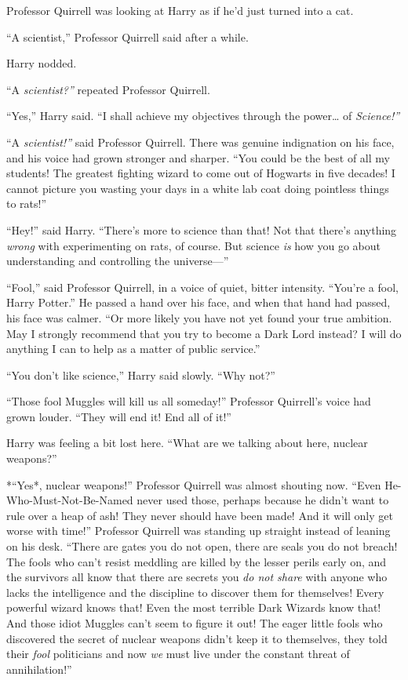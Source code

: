 Professor Quirrell was looking at Harry as if he'd just turned into a
cat.

``A scientist,'' Professor Quirrell said after a while.

Harry nodded.

``A \emph{scientist?''} repeated Professor Quirrell.

``Yes,'' Harry said. ``I shall achieve my objectives through the
power\ldots{} of \emph{Science!''}

``A \emph{scientist!''} said Professor Quirrell. There was genuine
indignation on his face, and his voice had grown stronger and sharper.
``You could be the best of all my students! The greatest fighting wizard
to come out of Hogwarts in five decades! I cannot picture you wasting
your days in a white lab coat doing pointless things to rats!''

``Hey!'' said Harry. ``There's more to science than that! Not that
there's anything \emph{wrong} with experimenting on rats, of course. But
science \emph{is} how you go about understanding and controlling the
universe---''

``Fool,'' said Professor Quirrell, in a voice of quiet, bitter
intensity. ``You're a fool, Harry Potter.'' He passed a hand over his
face, and when that hand had passed, his face was calmer. ``Or more
likely you have not yet found your true ambition. May I strongly
recommend that you try to become a Dark Lord instead? I will do anything
I can to help as a matter of public service.''

``You don't like science,'' Harry said slowly. ``Why not?''

``Those fool Muggles will kill us all someday!'' Professor Quirrell's
voice had grown louder. ``They will end it! End all of it!''

Harry was feeling a bit lost here. ``What are we talking about here,
nuclear weapons?''

*``Yes*, nuclear weapons!'' Professor Quirrell was almost shouting now.
``Even He-Who-Must-Not-Be-Named never used those, perhaps because he
didn't want to rule over a heap of ash! They never should have been
made! And it will only get worse with time!'' Professor Quirrell was
standing up straight instead of leaning on his desk. ``There are gates
you do not open, there are seals you do not breach! The fools who can't
resist meddling are killed by the lesser perils early on, and the
survivors all know that there are secrets you \emph{do not share} with
anyone who lacks the intelligence and the discipline to discover them
for themselves! Every powerful wizard knows that! Even the most terrible
Dark Wizards know that! And those idiot Muggles can't seem to figure it
out! The eager little fools who discovered the secret of nuclear weapons
didn't keep it to themselves, they told their \emph{fool} politicians
and now \emph{we} must live under the constant threat of annihilation!''

